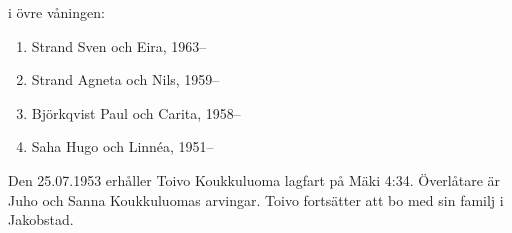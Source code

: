  i övre våningen:
\begin{enumerate}
  \item Strand Sven och Eira,	1963--
  \item Strand Agneta och Nils, 1959--
  \item Björkqvist Paul och Carita, 1958--
  \item Saha Hugo och Linnéa,	1951--
\end{enumerate}


%
Den 25.07.1953 erhåller Toivo Koukkuluoma lagfart på Mäki 4:34.	Överlåtare är Juho och Sanna Koukkuluomas arvingar. Toivo fortsätter att bo med sin familj i Jakobstad.


%
\jhvspace{}


